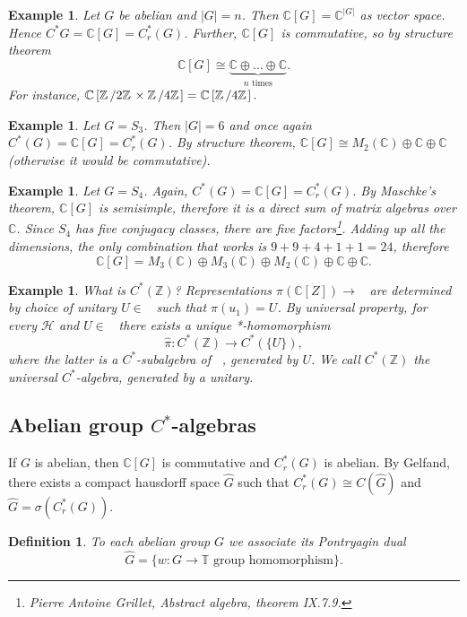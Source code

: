 \documentclass[10pt, a4paper]{article}
\newtheorem{defi}[thm]{Definition}
\newenvironment{noticeB}{%
  \tcolorbox[%
  notitle,
  empty,
  enhanced,  %
  breakable,
  coltext=black,
  colback=white, 
  fontupper=\rmfamily,
  noparskip,
  sharp corners,
  boxrule=-1pt,  %
  frame hidden,
  left=7pt,  %
  right=7pt,
  top=5pt,
  bottom=5pt,
  before skip=2.5ex plus 2pt,
  after skip=2.5ex plus 2pt,
  borderline west = {1.5pt}{-0.1pt}{blue!30!black}, %
  overlay unbroken and last={%
    \draw[color=black, line width=1.25pt]
    ($(frame.south west)+(1.pt, -0.1pt)$) -- ++(2em, 0);
  }
  ]}
{\endtcolorbox}
\newenvironment{definition}{\begin{noticeB}\begin{defi}}{%
    \end{defi}\end{noticeB}}
\newtheorem{example}[thm]{Example}
\newcommand{\Z}{\mathbb {Z}}
\newcommand{\C}{\mathbb {C}}
\newcommand{\quot}[2]{{\raisebox{0em}{$#1$}\left/\raisebox{0em}{$#2$}\right.}}
\DeclareMathOperator{\bh}{\mathcal{B} (\mathcal{H})}
\begin{document}
\begin{example}
  Let $G$ be abelian and $|G| = n$. Then $\C [G] = \C^{|G|}$ as vector space.
  Hence $C^* G = \C[G] = C_r ^* (G)$. Further, $\C[G]$ is commutative, so by structure theorem 
  $$\C [G] \cong \underbrace{\C \oplus \dots \oplus \C}_{\textrm{$n$ times}}.$$
  For instance, $\C \left[\quot{\Z}{2\Z} \times \quot{\Z}{4\Z}\right] = \C \left[\quot{\Z}{4 \Z}\right].$
\end{example}

\begin{example}
  Let $G = S_3$. Then $|G| = 6$ and once again $C^* (G) = \C [G] = C_r ^* (G)$.
  By structure theorem, $\C [G] \cong M_2 (\C) \oplus \C \oplus \C$ (otherwise it would be commutative).
\end{example}

\begin{example}
  Let $G = S_4$. Again, $C^* (G) = \C [G] = C_r ^* (G)$. By Maschke's theorem, $\C [G]$ is semisimple, therefore it is a direct sum of matrix algebras over $\C$.
  Since $S_4$ has five conjugacy classes, there are five factors\footnote{Pierre Antoine Grillet, \emph{Abstract algebra}, theorem IX.7.9.}.
  Adding up all the dimensions, the only combination that works is $9 + 9 + 4 + 1 + 1 = 24$, therefore 
  $$\C [G] = M_3 (\C) \oplus M_3 (\C) \oplus M_2 (\C) \oplus \C \oplus \C.$$
\end{example}

\begin{example}
  What is $C^* (\Z)$? Representations $\pi(\C [Z]) \to \bh$ are determined by choice of unitary $U \in \bh$ such that $\pi (u_1) = U$.
  By universal property, for every $\mathcal{H}$ and $U \in \bh$ there exists a unique *-homomorphism 
  $$\widehat{\pi}: C^* (\Z) \to C^* (\{U\}),$$ where the latter is a $C^*$-subalgebra of $\bh$, generated by $U$. 
  We call $C^* (\Z)$ the universal $C^*$-algebra, generated by a unitary.
\end{example}

\subsection{Abelian group $C^*$-algebras}

If $G$ is abelian, then $\C [G]$ is commutative and $C_r ^* (G)$ is abelian.
By Gelfand, there exists a compact hausdorff space $\widehat{G}$ such that $C_r ^* (G) \cong C(\widehat{G})$
and $\widehat{G} = \sigma(C_r ^* (G))$.

\begin{definition}
  To each abelian group $G$ we associate its Pontryagin dual 
  $$\widehat{G} = \{\textrm{$w: G \to \mathbb{T}$ group homomorphism}\}.$$
\end{definition}
\end{document}
